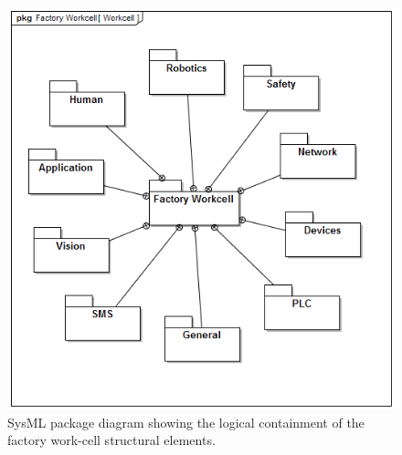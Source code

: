 \begin{figure}[t]
	\begin{center}
		\includegraphics[width=0.95\columnwidth]{./chapter-sysml/diagrams/pkg__Factory_Workcell__Workcell}%
		\caption{SysML package diagram showing the logical containment of the factory work-cell structural elements.}%
		\label{sysml:fig:pdd-workcell}
	\end{center}
\end{figure}

